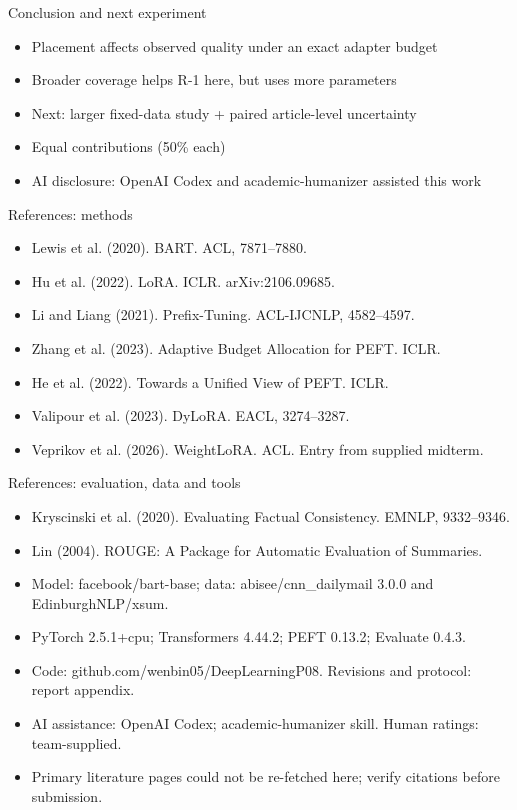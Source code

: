 \documentclass[aspectratio=169,11pt]{beamer}
\begin{document}
\begin{frame}{Conclusion and next experiment}
\begin{itemize}
\item Placement affects observed quality under an exact adapter budget
\item Broader coverage helps R-1 here, but uses more parameters
\item Next: larger fixed-data study + paired article-level uncertainty
\item Equal contributions (50\% each)
\item AI disclosure: OpenAI Codex and academic-humanizer assisted this work
\end{itemize}
\end{frame}
\begin{frame}{References: methods}\small\begin{itemize}
\item Lewis et al. (2020). BART. ACL, 7871--7880.
\item Hu et al. (2022). LoRA. ICLR. arXiv:2106.09685.
\item Li and Liang (2021). Prefix-Tuning. ACL-IJCNLP, 4582--4597.
\item Zhang et al. (2023). Adaptive Budget Allocation for PEFT. ICLR.
\item He et al. (2022). Towards a Unified View of PEFT. ICLR.
\item Valipour et al. (2023). DyLoRA. EACL, 3274--3287.
\item Veprikov et al. (2026). WeightLoRA. ACL. Entry from supplied midterm.
\end{itemize}\end{frame}
\begin{frame}{References: evaluation, data and tools}\small\begin{itemize}
\item Kryscinski et al. (2020). Evaluating Factual Consistency. EMNLP, 9332--9346.
\item Lin (2004). ROUGE: A Package for Automatic Evaluation of Summaries.
\item Model: facebook/bart-base; data: abisee/cnn\_dailymail 3.0.0 and EdinburghNLP/xsum.
\item PyTorch 2.5.1+cpu; Transformers 4.44.2; PEFT 0.13.2; Evaluate 0.4.3.
\item Code: github.com/wenbin05/DeepLearningP08. Revisions and protocol: report appendix.
\item AI assistance: OpenAI Codex; academic-humanizer skill. Human ratings: team-supplied.
\item Primary literature pages could not be re-fetched here; verify citations before submission.
\end{itemize}\end{frame}
\end{document}
